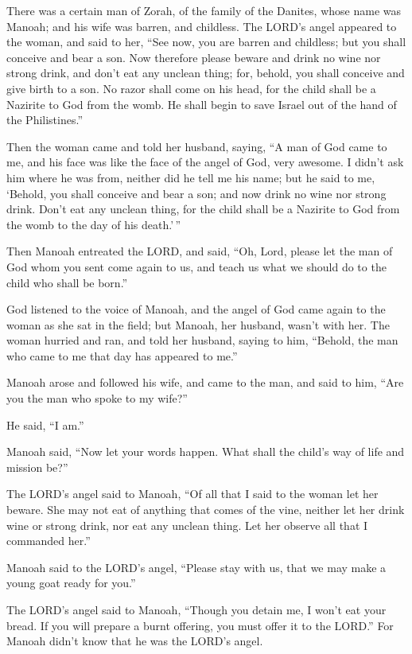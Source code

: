  There was a certain man of Zorah, of the family of the
Danites, whose name was Manoah; and his wife was barren, and childless.
 The LORD's angel appeared to the woman, and said to her,
``See now, you are barren and childless; but you shall conceive and bear
a son.  Now therefore please beware and drink no wine nor
strong drink, and don't eat any unclean thing;  for, behold,
you shall conceive and give birth to a son. No razor shall come on his
head, for the child shall be a Nazirite to God from the womb. He shall
begin to save Israel out of the hand of the Philistines.''

 Then the woman came and told her husband, saying, ``A man
of God came to me, and his face was like the face of the angel of God,
very awesome. I didn't ask him where he was from, neither did he tell me
his name;  but he said to me, `Behold, you shall conceive
and bear a son; and now drink no wine nor strong drink. Don't eat any
unclean thing, for the child shall be a Nazirite to God from the womb to
the day of his death.'\,''

 Then Manoah entreated the LORD, and said, ``Oh, Lord,
please let the man of God whom you sent come again to us, and teach us
what we should do to the child who shall be born.''

 God listened to the voice of Manoah, and the angel of God
came again to the woman as she sat in the field; but Manoah, her
husband, wasn't with her.  The woman hurried and ran, and
told her husband, saying to him, ``Behold, the man who came to me that
day has appeared to me.''

 Manoah arose and followed his wife, and came to the man,
and said to him, ``Are you the man who spoke to my wife?''

He said, ``I am.''

 Manoah said, ``Now let your words happen. What shall the
child's way of life and mission be?''

 The LORD's angel said to Manoah, ``Of all that I said to
the woman let her beware.  She may not eat of anything that
comes of the vine, neither let her drink wine or strong drink, nor eat
any unclean thing. Let her observe all that I commanded her.''

 Manoah said to the LORD's angel, ``Please stay with us,
that we may make a young goat ready for you.''

 The LORD's angel said to Manoah, ``Though you detain me, I
won't eat your bread. If you will prepare a burnt offering, you must
offer it to the LORD.'' For Manoah didn't know that he was the LORD's
angel.

